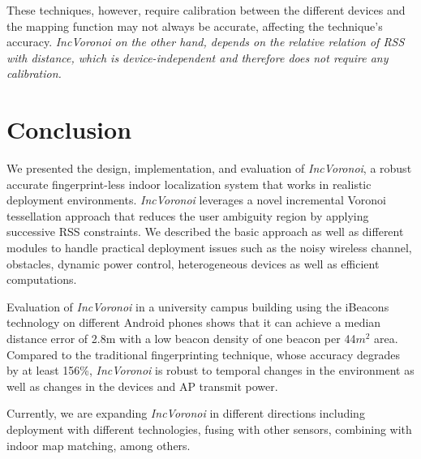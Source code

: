 \documentclass[conference]{IEEEtran}
\def \sys {\textit{IncVoronoi}}
\begin{document}
These techniques, however, require calibration between the different devices and the mapping function may not always be accurate, affecting the technique's accuracy. \emph{\sys{} on the other hand, depends on the relative relation of RSS with distance, which is device-independent and therefore does not require any calibration.
}

\section{Conclusion}
\label{sec:conclude}
We presented the design, implementation, and evaluation of \sys{}, a robust  accurate fingerprint-less indoor localization system that works in realistic deployment environments. \sys{} leverages a novel incremental Voronoi tessellation approach that reduces the user ambiguity region by applying successive RSS constraints.  We described the basic approach as well as different modules to handle practical deployment issues such as the noisy wireless channel, obstacles, dynamic power control, heterogeneous devices 
as well as efficient computations.

  Evaluation of \sys{} in a university campus building using the iBeacons technology on different Android phones shows that it can achieve a median distance error of 2.8m with a low beacon density of one beacon per 44$m^2$ area. Compared to the traditional fingerprinting technique, whose accuracy degrades by at least 156\%,  \sys{} is robust to temporal changes in the environment as well as changes in the devices and AP transmit power. 

  Currently, we are expanding \sys{} in different directions including deployment with different technologies, fusing with other sensors, combining with indoor map matching, among others.
\end{document}

